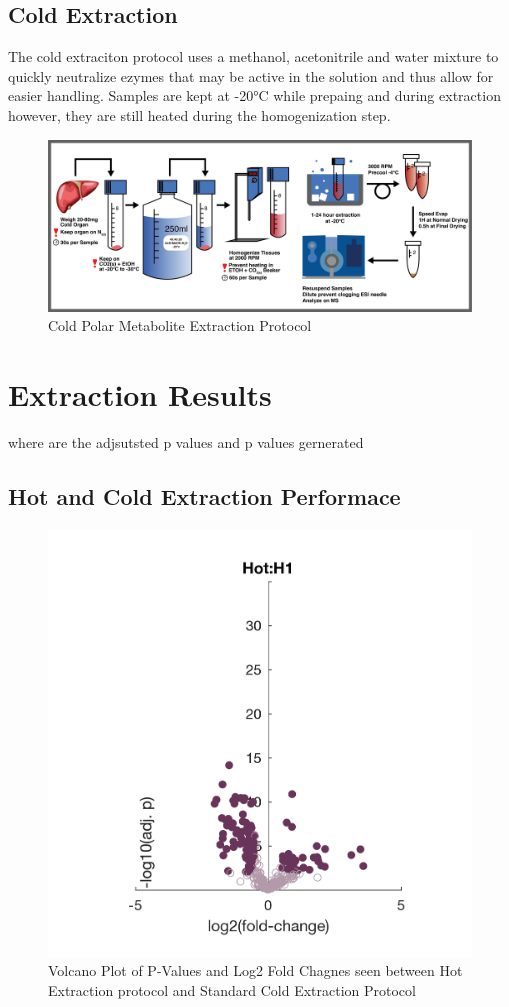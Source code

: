 \documentclass[a4paper]{article}
\begin{document}
\subsection{Cold Extraction}

The cold extraciton protocol uses a methanol, acetonitrile and water mixture to quickly neutralize ezymes that may be active in the solution and thus allow for easier handling. Samples are kept at -20°C while prepaing and during extraction however, they are still heated during the homogenization step. 

\begin{figure}[h]
	\centering
	\includegraphics[width=\linewidth]{Metab-Cold-Proto-MH-20170120}
	\caption{Cold Polar Metabolite Extraction Protocol}
	\label{fig:metab-cold-proto-mh-20170105}
\end{figure}


\section{Extraction Results}


where are the adjsutsted p values and p values gernerated 


\subsection{Hot and Cold Extraction Performace}
\begin{figure}[H]
	\centering
	\includegraphics[width=0.5\linewidth]{Hot_H1_01}
	\caption{Volcano Plot of P-Values and Log2 Fold Chagnes seen between Hot Extraction protocol and Standard Cold Extraction Protocol}
	\label{fig:hoth101}
\end{figure}
\end{document}
